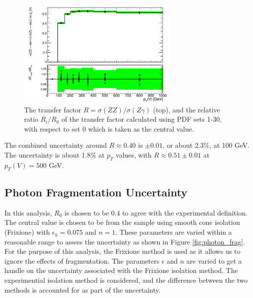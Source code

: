 \documentclass[11pt,a4paper,openright,twoside]{report}
\begin{document}
\begin{figure}[H]
\centering
	\includegraphics[width = 0.7\textwidth]{R_pdf.png}
	\caption{The transfer factor $R = \sigma(ZZ)/\sigma(Z\gamma)$ (top), and the relative ratio $R_i/R_0$ of the transfer factor  calculated using PDF sets 1-30, with respect to set 0 which is taken as the central value. }
	\label{fig:PDF30var}
\end{figure}

The combined uncertainty around $R \approx 0.40$ is $\pm 0.01$, or about 2.3\%, at 100 GeV. The uncertainty is about 1.8\% at $p_T$ values, with $R \approx 0.51 \pm 0.01$ at $p_T(V)=500$ GeV.

\subsection{Photon Fragmentation Uncertainty}\label{subsec:photon_fragmentation}

In this analysis, $R_0$ is chosen to be 0.4 to agree with the experimental definition. The central value is chosen to be from the sample using smooth cone isolation (Frixione) with $\epsilon_h = 0.075$ and $n=1$. These parameters are varied within a reasonable range to assess the uncertainty as shown in Figure \ref{fig:photon_frag}. For the purpose of this analysis, the Frixione method is used as it allows us to ignore the effects of fragmentation. The parameters $\epsilon$ and $n$ are varied to get a handle on the uncertainty associated with the Frixione isolation method. The experimential isolation method is considered, and the difference between the two methods is accounted for as part of the uncertainty.
\end{document}
